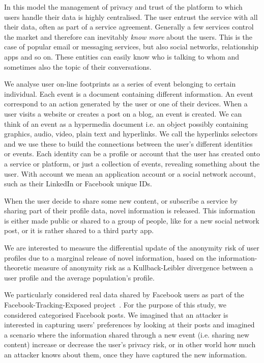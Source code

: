 In this model the management of privacy and trust of the platform to which users handle their data is highly centralised. The user entrust the service with all their data, often as part of a service agreement. Generally a few services control the market and therefore can inevitably \emph{know more} about the users. This is the case of popular email or messaging services, but also social networks, relationship apps and so on. These entities can easily know who is talking to whom and sometimes also the topic of their conversations.

We analyse user on-line footprints as a series of event belonging to certain individual. Each event is a document containing different information. An event correspond to an action generated by the user or one of their devices. When a user visits a website or creates a post on a blog, an event is created. We can think of an event as a hypermedia document i.e. an object possibly containing graphics, audio, video, plain text and hyperlinks. We call the hyperlinks selectors and we use these to build the connections between the user's different identities or events. Each identity can be a profile or account that the user has created onto a service or platform, or just a collection of events, revealing something about the user. With account we mean an application account or a social network account, such as their LinkedIn or Facebook unique IDs.

When the user decide to share some new content, or subscribe a service by sharing part of their profile data, novel information is released. This information is either made public or shared to a group of people, like for a new social network post, or it is rather shared to a third party app.

We are interested to measure the differential update of the anonymity risk of user profiles due to a marginal release of novel information, based on the information-theoretic measure of anonymity risk as a Kullback-Leibler divergence between a user profile and the average population's profile.

We particularly considered real data shared by Facebook users as part of the Facebook-Tracking-Exposed project~\cite{FTE}. For the purpose of this study, we considered categorised Facebook posts. We imagined that an attacker is interested in capturing users' preferences by looking at their posts and imagined a scenario where the information shared through a new event (i.e.  sharing new content) increase or decrease the user's privacy risk, or in other world how much an attacker knows about them, once they have captured the new information.

